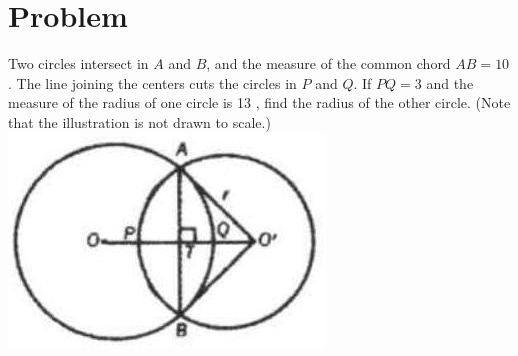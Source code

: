 \documentclass{article}
\begin{document}
\section*{Problem}
Two circles intersect in \(A\) and \(B\), and the measure of the common chord \(A B=10\). The line joining the centers cuts the circles in \(P\) and \(Q\). If \(P Q=3\) and the measure of the radius of one circle is 13 , find the radius of the other circle. (Note that the illustration is not drawn to scale.)\\
\centering
\includegraphics[width=\textwidth]{images/185.jpg}
\end{document}
